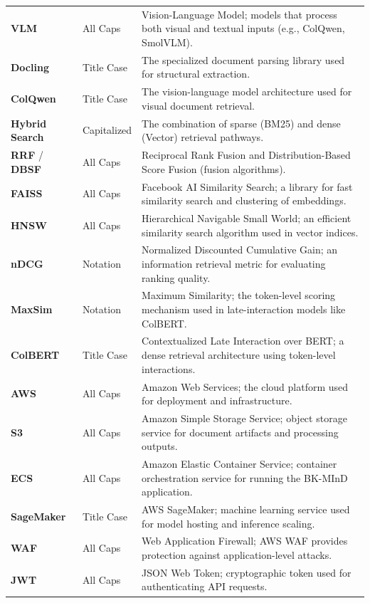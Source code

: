 \begin{longtable}{llp{8cm}}
\textbf{VLM} & All Caps & Vision-Language Model; models that process both visual and textual inputs (e.g., ColQwen, SmolVLM). \\
\textbf{Docling} & Title Case & The specialized document parsing library used for structural extraction. \\
\textbf{ColQwen} & Title Case & The vision-language model architecture used for visual document retrieval. \\
\textbf{Hybrid Search} & Capitalized & The combination of sparse (BM25) and dense (Vector) retrieval pathways. \\
\textbf{RRF} / \textbf{DBSF} & All Caps & Reciprocal Rank Fusion and Distribution-Based Score Fusion (fusion algorithms). \\
\textbf{FAISS} & All Caps & Facebook AI Similarity Search; a library for fast similarity search and clustering of embeddings. \\
\textbf{HNSW} & All Caps & Hierarchical Navigable Small World; an efficient similarity search algorithm used in vector indices. \\
\textbf{nDCG} & Notation & Normalized Discounted Cumulative Gain; an information retrieval metric for evaluating ranking quality. \\
\textbf{MaxSim} & Notation & Maximum Similarity; the token-level scoring mechanism used in late-interaction models like ColBERT. \\
\textbf{ColBERT} & Title Case & Contextualized Late Interaction over BERT; a dense retrieval architecture using token-level interactions. \\
\textbf{AWS} & All Caps & Amazon Web Services; the cloud platform used for deployment and infrastructure. \\
\textbf{S3} & All Caps & Amazon Simple Storage Service; object storage service for document artifacts and processing outputs. \\
\textbf{ECS} & All Caps & Amazon Elastic Container Service; container orchestration service for running the BK-MInD application. \\
\textbf{SageMaker} & Title Case & AWS SageMaker; machine learning service used for model hosting and inference scaling. \\
\textbf{WAF} & All Caps & Web Application Firewall; AWS WAF provides protection against application-level attacks. \\
\textbf{JWT} & All Caps & JSON Web Token; cryptographic token used for authenticating API requests. \\

\end{longtable}
